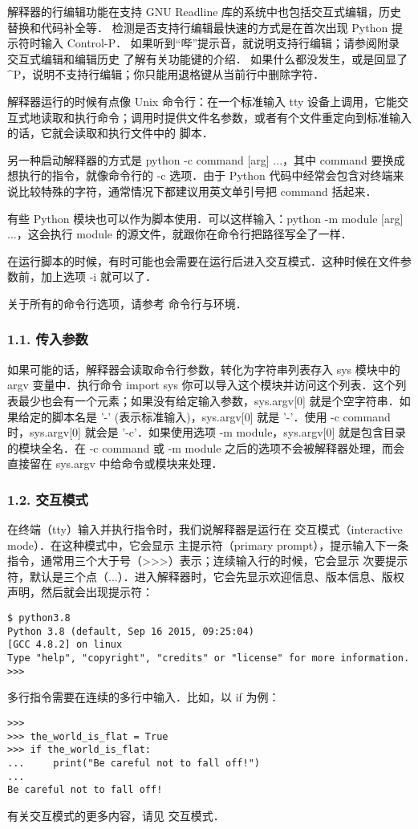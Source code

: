 解释器的行编辑功能在支持 GNU Readline 库的系统中也包括交互式编辑，历史替换和代码补全等． 检测是否支持行编辑最快速的方式是在首次出现 Python 提示符时输入 Control-P． 如果听到“哔”提示音，就说明支持行编辑；请参阅附录 交互式编辑和编辑历史 了解有关功能键的介绍． 如果什么都没发生，或是回显了 ^P，说明不支持行编辑；你只能用退格键从当前行中删除字符．

解释器运行的时候有点像 Unix 命令行：在一个标准输入 tty 设备上调用，它能交互式地读取和执行命令；调用时提供文件名参数，或者有个文件重定向到标准输入的话，它就会读取和执行文件中的 脚本．

另一种启动解释器的方式是 python -c command [arg] ...，其中 command 要换成想执行的指令，就像命令行的 -c 选项．由于 Python 代码中经常会包含对终端来说比较特殊的字符，通常情况下都建议用英文单引号把 command 括起来．

有些 Python 模块也可以作为脚本使用．可以这样输入：python -m module [arg] ...，这会执行 module 的源文件，就跟你在命令行把路径写全了一样．

在运行脚本的时候，有时可能也会需要在运行后进入交互模式．这种时候在文件参数前，加上选项 -i 就可以了．

关于所有的命令行选项，请参考 命令行与环境．

\subsubsection{1.1. 传入参数}
如果可能的话，解释器会读取命令行参数，转化为字符串列表存入 sys 模块中的 argv 变量中．执行命令 import sys 你可以导入这个模块并访问这个列表．这个列表最少也会有一个元素；如果没有给定输入参数，sys.argv[0] 就是个空字符串．如果给定的脚本名是 '-' (表示标准输入)，sys.argv[0] 就是 '-'．使用 -c command 时，sys.argv[0] 就会是 '-c'．如果使用选项 -m module，sys.argv[0] 就是包含目录的模块全名．在 -c command 或 -m module 之后的选项不会被解释器处理，而会直接留在 sys.argv 中给命令或模块来处理．

\subsubsection{1.2. 交互模式}

在终端（tty）输入并执行指令时，我们说解释器是运行在 交互模式（interactive mode）．在这种模式中，它会显示 主提示符（primary prompt），提示输入下一条指令，通常用三个大于号（>>>）表示；连续输入行的时候，它会显示 次要提示符，默认是三个点（...）．进入解释器时，它会先显示欢迎信息、版本信息、版权声明，然后就会出现提示符：

\begin{lstlisting}[language=pythonC]
$ python3.8
Python 3.8 (default, Sep 16 2015, 09:25:04)
[GCC 4.8.2] on linux
Type "help", "copyright", "credits" or "license" for more information.
>>>
\end{lstlisting}
多行指令需要在连续的多行中输入．比如，以 if 为例：
\begin{lstlisting}[language=pythonC]
>>>
>>> the_world_is_flat = True
>>> if the_world_is_flat:
...     print("Be careful not to fall off!")
...
Be careful not to fall off!
\end{lstlisting}
有关交互模式的更多内容，请见 交互模式．

